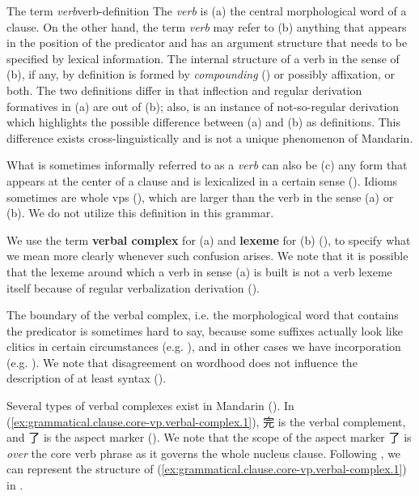 \documentclass[UTF8, a4paper, oneside, scheme=plain, 12pt]{ctexrep}
\newcommand*{\concept}[1]{\textbf{#1}}
\newcommand*{\term}[1]{\emph{#1}}
\begin{document}
\begin{theorybox}{The term \term{verb}}{verb-definition}
    The \term{verb} is (a) the central morphological word of a clause.
    On the other hand, the term \term{verb} may refer to
    (b) anything that appears in the position of the predicator and has an argument structure
    that needs to be specified by lexical information.
    The internal structure of a verb in the sense of (b), if any,
    by definition is formed by \term{compounding} ()
    or possibly affixation, or both.
    The two definitions differ in that inflection and regular derivation formatives in (a)
    are out of (b);
    also,  is an instance of not-so-regular derivation
    which highlights the possible difference between (a) and (b) as definitions.
    This difference exists cross-linguistically
    and is not a unique phenomenon of Mandarin.
    
    What is sometimes informally referred to as a \term{verb} 
    can also be (c) any form that appears at the center of a clause
    and is lexicalized in a certain sense ().
    Idioms sometimes are whole \acp{vp} (),
    which are larger than the verb in the sense (a) or (b).
    We do not utilize this definition in this grammar.

    We use the term \concept{verbal complex} for (a)
    and \concept{lexeme} for (b) (),
    to specify what we mean more clearly whenever such confusion arises.
    We note that it is possible that the lexeme around which a verb in sense (a) is built
    is not a verb lexeme itself because of regular verbalization derivation
    ().
\end{theorybox}

The boundary of the verbal complex, i.e. the morphological word that contains the predicator
is sometimes hard to say,
because some suffixes actually look like clitics in certain circumstances
(e.g. ),
and in other cases we have incorporation (e.g. ).
We note that disagreement on wordhood does not influence the description of at least syntax
().

Several types of verbal complexes exist in Mandarin
().
In (\ref{ex:grammatical.clause.core-vp.verbal-complex.1}),
完 is the verbal complement, and 了 is the aspect marker
().
We note that the scope of the aspect marker 了 is \emph{over} the core verb phrase
as it governs the whole nucleus clause.
Following ,
we can represent the structure of (\ref{ex:grammatical.clause.core-vp.verbal-complex.1})
in .
\end{document}
